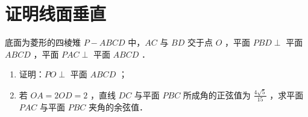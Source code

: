 \section{证明线面垂直}

\begin{example}
    底面为菱形的四棱雉 $P-A B C D$ 中，$A C$ 与 $B D$ 交于点 $O$ ，平面 $P B D \perp$ 平面 $A B C D$ ，平面 $P A C \perp$ 平面 $A B C D$ ．
    \begin{enumerate}
        \item 证明：$P O \perp$ 平面 $A B C D$ ；

        \item 若 $O A=2 O D=2$ ，直线 $D C$ 与平面 $P B C$ 所成角的正弦值为 $\frac{4 \sqrt{5}}{15}$ ，求平面 $P A C$ 与平面 $P B C$ 夹角的余弦值．
    \end{enumerate}
\end{example}

\begin{figure} [H]
    \centering
    \resizebox{0.2\textwidth}{!}{}
\end{figure}
